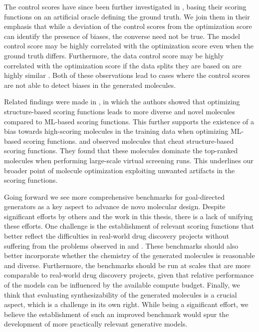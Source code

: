 The control scores have since been further investigated in \citep{turkMolecularAssaysSimulator2022},
basing their scoring functions on an artificial oracle defining the ground truth. We join them in
their emphasis that while a deviation of the control scores from the optimization score can identify
the presence of biases, the converse need not be true. The model control score may be highly
correlated with the optimization score even when the ground truth differs. Furthermore, the data
control score may be highly correlated with the optimization score if the data splits they are based
on are highly similar \citep{langevinExplainingAvoidingFailure2022}. Both of these observations lead
to cases where the control scores are not able to detect biases in the generated molecules.

Related findings were made in \citep{thomasReevaluatingSampleEfficiency2022}, in which the authors
showed that optimizing structure-based scoring functions leads to more diverse and novel molecules
compared to \ac{ML}-based scoring functions. This further supports the existence of a bias towards
high-scoring molecules in the training data when optimizing \ac{ML}-based scoring functions.
\citet{lyuModelingExpansionVirtual2023} and \citet{wuIdentifyingArtifactsLarge2024} observed
molecules that cheat structure-based scoring functions. They found that these molecules dominate the
top-ranked molecules when performing large-scale virtual screening runs. This underlines our
broader point of molecule optimization exploiting unwanted artifacts in the scoring functions.

Going forward we see more comprehensive benchmarks for goal-directed generators as a key aspect to
advance de novo molecular design. Despite significant efforts by others
\citep{brownGuacaMolBenchmarkingModels2019,polykovskiyMolecularSetsMOSES2020,gaoSynthesizabilityMoleculesProposed2020,gaoSampleEfficiencyMatters2022,thomasMolScoreScoringEvaluation2024}
and the work in this thesis, there is a lack of unifying these efforts. One challenge is the
establishment of relevant scoring functions that better reflect the difficulties in real-world drug
discovery projects \citep{fromerComputeraidedMultiobjectiveOptimization2023} without suffering from
the problems observed in  and
\citep{lyuModelingExpansionVirtual2023,wuIdentifyingArtifactsLarge2024}. These benchmarks should
also better incorporate whether the chemistry of the generated molecules is reasonable
\citep{thomasReevaluatingSampleEfficiency2022} and diverse. Furthermore, the benchmarks should be
run at scales that are more comparable to real-world drug discovery projects, given that relative
performance of the models can be influenced by the available compute budget. Finally, we think that
evaluating synthesizability of the generated molecules is a crucial aspect, which is a challenge in
its own right. While being a significant effort, we believe the establishment of such an improved
benchmark would spur the development of more practically relevant generative models.

